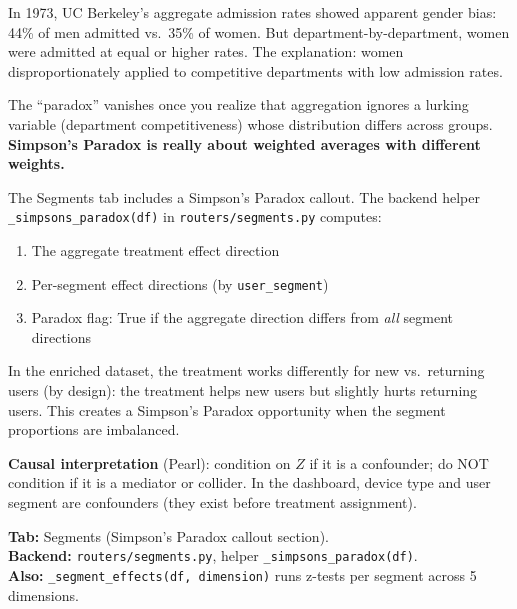 \documentclass[11pt,a4paper]{article}
\newcommand{\code}[1]{\texttt{#1}}
\begin{document}
\vspace{8pt}

\begin{intuition}
In 1973, UC Berkeley's aggregate admission rates showed apparent gender bias: 44\% of men admitted vs.\ 35\% of women. But department-by-department, women were admitted at equal or higher rates. The explanation: women disproportionately applied to competitive departments with low admission rates.

The ``paradox'' vanishes once you realize that aggregation ignores a lurking variable (department competitiveness) whose distribution differs across groups. \textbf{Simpson's Paradox is really about weighted averages with different weights.}
\end{intuition}

\vspace{8pt}

\begin{application}
The Segments tab includes a Simpson's Paradox callout. The backend helper \code{\_simpsons\_paradox(df)} in \code{routers/segments.py} computes:
\begin{enumerate}[nosep]
  \item The aggregate treatment effect direction
  \item Per-segment effect directions (by \code{user\_segment})
  \item Paradox flag: True if the aggregate direction differs from \emph{all} segment directions
\end{enumerate}

In the enriched dataset, the treatment works differently for new vs.\ returning users (by design): the treatment helps new users but slightly hurts returning users. This creates a Simpson's Paradox opportunity when the segment proportions are imbalanced.

\medskip
\textbf{Causal interpretation} (Pearl): condition on $Z$ if it is a confounder; do NOT condition if it is a mediator or collider. In the dashboard, device type and user segment are confounders (they exist before treatment assignment).
\end{application}

\vspace{8pt}

\begin{dashlink}
\textbf{Tab:} Segments (Simpson's Paradox callout section).\\
\textbf{Backend:} \code{routers/segments.py}, helper \code{\_simpsons\_paradox(df)}.\\
\textbf{Also:} \code{\_segment\_effects(df, dimension)} runs z-tests per segment across 5 dimensions.
\end{dashlink}
\end{document}
